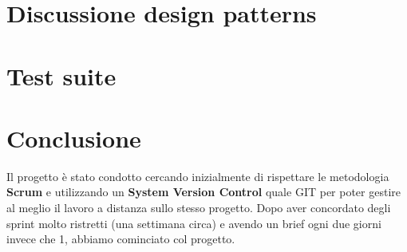 \documentclass[12pt, a4paper]{article}
\numberwithin{equation}{section} %
\begin{document}

\section{Discussione design patterns}


\section{Test suite}


\section{Conclusione}
Il progetto è stato condotto cercando inizialmente di rispettare le metodologia \textbf{Scrum} e utilizzando un \textbf{System Version Control} quale GIT per poter gestire al meglio il lavoro a distanza sullo stesso progetto. Dopo aver concordato degli sprint molto ristretti (una settimana circa) e avendo un brief ogni due giorni invece che 1, abbiamo cominciato col progetto.
\end{document}
